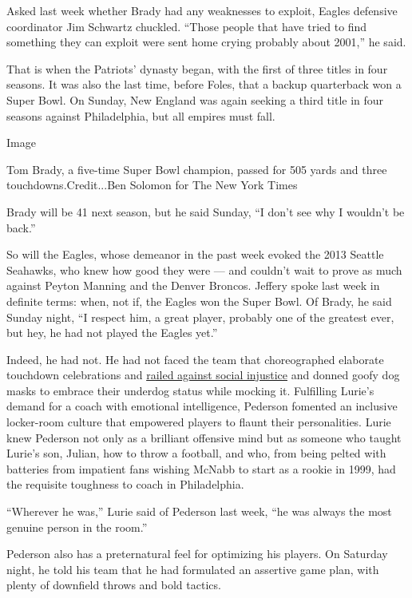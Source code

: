 Asked last week whether Brady had any weaknesses to exploit, Eagles
defensive coordinator Jim Schwartz chuckled. ``Those people that have
tried to find something they can exploit were sent home crying probably
about 2001,'' he said.

That is when the Patriots' dynasty began, with the first of three titles
in four seasons. It was also the last time, before Foles, that a backup
quarterback won a Super Bowl. On Sunday, New England was again seeking a
third title in four seasons against Philadelphia, but all empires must
fall.

Image

Tom Brady, a five-time Super Bowl champion, passed for 505 yards and
three touchdowns.Credit...Ben Solomon for The New York Times

Brady will be 41 next season, but he said Sunday, ``I don't see why I
wouldn't be back.''

So will the Eagles, whose demeanor in the past week evoked the 2013
Seattle Seahawks, who knew how good they were --- and couldn't wait to
prove as much against Peyton Manning and the Denver Broncos. Jeffery
spoke last week in definite terms: when, not if, the Eagles won the
Super Bowl. Of Brady, he said Sunday night, ``I respect him, a great
player, probably one of the greatest ever, but hey, he had not played
the Eagles yet.''

Indeed, he had not. He had not faced the team that choreographed
elaborate touchdown celebrations and
\href{https://www.nytimes3xbfgragh.onion/2018/01/25/sports/football/malcolm-jenkins-eagles-super-bowl.html}{railed
against social injustice} and donned goofy dog masks to embrace their
underdog status while mocking it. Fulfilling Lurie's demand for a coach
with emotional intelligence, Pederson fomented an inclusive locker-room
culture that empowered players to flaunt their personalities. Lurie knew
Pederson not only as a brilliant offensive mind but as someone who
taught Lurie's son, Julian, how to throw a football, and who, from being
pelted with batteries from impatient fans wishing McNabb to start as a
rookie in 1999, had the requisite toughness to coach in Philadelphia.

``Wherever he was,'' Lurie said of Pederson last week, ``he was always
the most genuine person in the room.''

Pederson also has a preternatural feel for optimizing his players. On
Saturday night, he told his team that he had formulated an assertive
game plan, with plenty of downfield throws and bold tactics.

